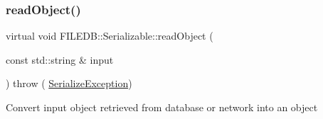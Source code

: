 \mbox{\label{classFILEDB_1_1Serializable_a21a5831fa4f65790490a8a5eba9fcab2}} 
\subsubsection{\texorpdfstring{readObject()}{readObject()}\hspace{0.1cm}{\footnotesize\ttfamily [2/3]}}
{\footnotesize\ttfamily virtual void F\+I\+L\+E\+D\+B\+::\+Serializable\+::read\+Object (\begin{DoxyParamCaption}\item[{const std\+::string \&}]{input }\end{DoxyParamCaption}) throw ( \mbox{\hyperlink{classFILEDB_1_1SerializeException}{Serialize\+Exception}}) \hspace{0.3cm}{\ttfamily [pure virtual]}}

Convert input object retrieved from database or network into an object 

